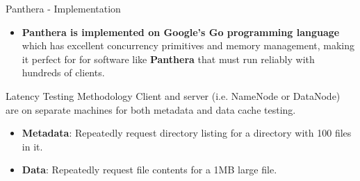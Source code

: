 \documentclass[final]{beamer} %
\begin{document}
\begin{frame}
\begin{columns}[t]
\begin{column}{0.32\textwidth}
      

	\begin{block}{Panthera - Implementation}
	\begin{itemize}
		\item \textbf{Panthera is implemented on Google's Go programming language} which has excellent concurrency primitives and memory management, making it perfect for
		for software like \textbf{Panthera} that must run reliably with hundreds of clients.
	\end{itemize}
	\end{block}
	
	\begin{block}{Latency Testing Methodology}
	Client and server (i.e. NameNode or DataNode) are on separate machines
	for both metadata and data cache testing.
	\begin{itemize}
		\item \textbf{Metadata}: Repeatedly request directory listing for a directory with 100 files in it.
		\item \textbf{Data}: Repeatedly request file contents for a 1MB large file.
	\end{itemize}


\end{block}
\end{column}
\end{columns}
\end{frame}
\end{document}
